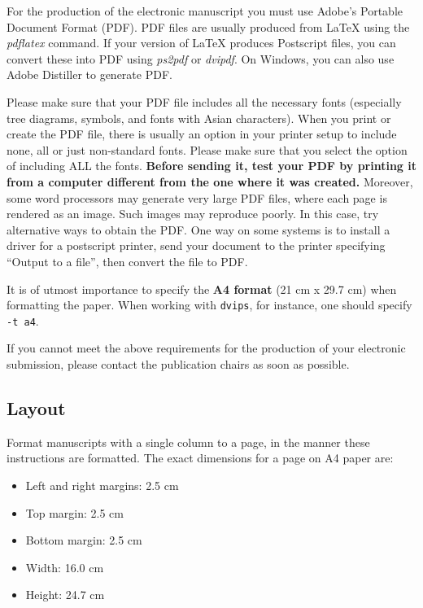 \documentclass[11pt]{article}
\begin{document}
For the production of the electronic manuscript you must use Adobe's
Portable Document Format (PDF). PDF files are usually produced from
\LaTeX{} using the \textit{pdflatex} command. If your version of
\LaTeX{} produces Postscript files, you can convert these into PDF
using \textit{ps2pdf} or \textit{dvipdf}. On Windows, you can also use
Adobe Distiller to generate PDF.

Please make sure that your PDF file includes all the necessary fonts
(especially tree diagrams, symbols, and fonts with Asian
characters). When you print or create the PDF file, there is usually
an option in your printer setup to include none, all or just
non-standard fonts.  Please make sure that you select the option of
including ALL the fonts. \textbf{Before sending it, test your PDF by
  printing it from a computer different from the one where it was
  created.} Moreover, some word processors may generate very large PDF
files, where each page is rendered as an image. Such images may
reproduce poorly. In this case, try alternative ways to obtain the
PDF. One way on some systems is to install a driver for a postscript
printer, send your document to the printer specifying ``Output to a
file'', then convert the file to PDF.

It is of utmost importance to specify the \textbf{A4 format} (21 cm
x 29.7 cm) when formatting the paper. When working with
{\tt dvips}, for instance, one should specify {\tt -t a4}.

If you cannot meet the above requirements
for the
production of your electronic submission, please contact the
publication chairs as soon as possible.


\subsection{Layout}
\label{ssec:layout}

Format manuscripts with a single column to a page, in the manner these
instructions are formatted. The exact dimensions for a page on A4
paper are:

\begin{itemize}
\item Left and right margins: 2.5 cm
\item Top margin: 2.5 cm
\item Bottom margin: 2.5 cm
\item Width: 16.0 cm
\item Height: 24.7 cm
\end{itemize}
\end{document}
